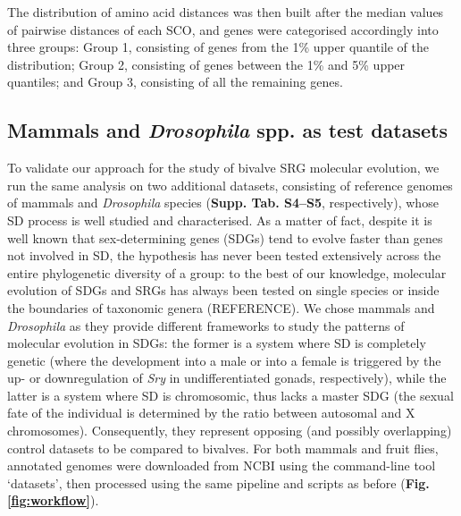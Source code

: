 \documentclass[../main.tex]{subfiles}
\begin{document}
The distribution of amino acid distances was then built after the median values of pairwise distances of each SCO, and genes were categorised accordingly into three groups: Group 1, consisting of genes from the 1\% upper quantile of the distribution; Group 2, consisting of genes between the 1\% and 5\% upper quantiles; and Group 3, consisting of all the remaining genes.

\subsection{Mammals and \textit{Drosophila} spp. as test datasets}
To validate our approach for the study of bivalve SRG molecular evolution, we run the same analysis on two additional datasets, consisting of reference genomes of mammals and \textit{Drosophila} species (\textbf{Supp. Tab. S4--S5}, respectively), whose SD process is well studied and characterised. As a matter of fact, despite it is well known that sex-determining genes (SDGs) tend to evolve faster than genes not involved in SD, the hypothesis has never been tested extensively across the entire phylogenetic diversity of a group: to the best of our knowledge, molecular evolution of SDGs and SRGs has always been tested on single species or inside the boundaries of taxonomic genera (REFERENCE). We chose mammals and \textit{Drosophila} as they provide different frameworks to study the patterns of molecular evolution in SDGs: the former is a system where SD is completely genetic (where the development into a male or into a female is triggered by the up- or downregulation of \textit{Sry} in undifferentiated gonads, respectively), while the latter is a system where SD is chromosomic, thus lacks a master SDG (the sexual fate of the individual is determined by the ratio between autosomal and X chromosomes). Consequently, they represent opposing (and possibly overlapping) control datasets to be compared to bivalves. For both mammals and fruit flies, annotated genomes were downloaded from NCBI using the command-line tool ‘datasets’, then processed using the same pipeline and scripts as before (\textbf{Fig. \ref{fig:workflow}}).
\end{document}

